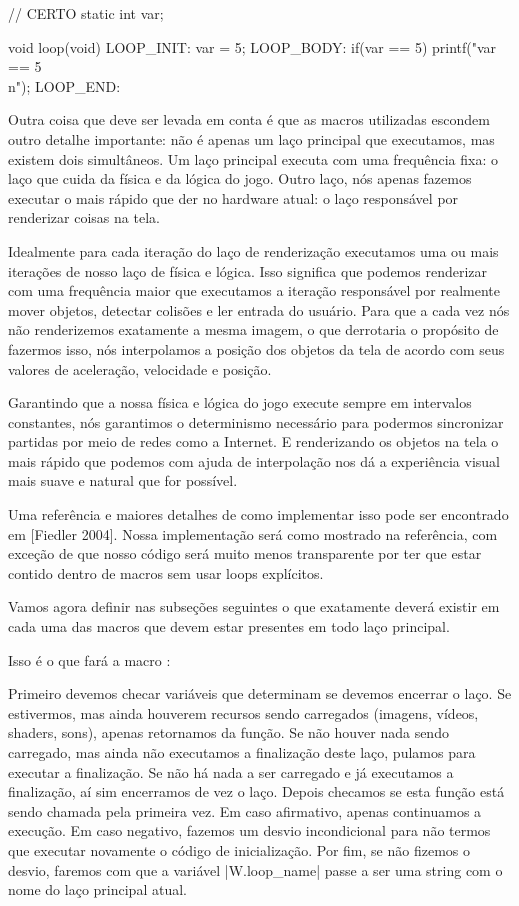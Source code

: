 \alinhaverbatim
// CERTO
static int var;

void loop(void){
LOOP\_INIT:
  var = 5;
LOOP\_BODY:
  if(var == 5)
    printf("var == 5\\n");
LOOP\_END:
}
\alinhanormal

Outra coisa que deve ser levada em conta é que as macros utilizadas
escondem outro detalhe importante: não é apenas um laço principal que
executamos, mas existem dois simultâneos. Um laço principal executa
com uma frequência fixa: o laço que cuida da física e da lógica do
jogo. Outro laço, nós apenas fazemos executar o mais rápido que der no
hardware atual: o laço responsável por renderizar coisas na tela.

Idealmente para cada iteração do laço de renderização executamos uma
ou mais iterações de nosso laço de física e lógica. Isso significa que
podemos renderizar com uma frequência maior que executamos a iteração
responsável por realmente mover objetos, detectar colisões e ler
entrada do usuário. Para que a cada vez nós não renderizemos
exatamente a mesma imagem, o que derrotaria o propósito de fazermos
isso, nós interpolamos a posição dos objetos da tela de acordo com
seus valores de aceleração, velocidade e posição.

Garantindo que a nossa física e lógica do jogo execute sempre em
intervalos constantes, nós garantimos o determinismo necessário para
podermos sincronizar partidas por meio de redes como a Internet. E
renderizando os objetos na tela o mais rápido que podemos com ajuda de
interpolação nos dá a experiência visual mais suave e natural que for
possível.

Uma referência e maiores detalhes de como implementar isso pode ser
encontrado em [Fiedler 2004]. Nossa implementação será como mostrado
na referência, com exceção de que nosso código será muito menos
transparente por ter que estar contido dentro de macros sem usar loops
explícitos.

Vamos agora definir nas subseções seguintes o que exatamente deverá
existir em cada uma das macros que devem estar presentes em todo laço
principal.


Isso é o que fará a macro :

Primeiro devemos checar variáveis que determinam se devemos encerrar o
laço. Se estivermos, mas ainda houverem recursos sendo carregados
(imagens, vídeos, shaders, sons), apenas retornamos da função. Se não
houver nada sendo carregado, mas ainda não executamos a finalização
deste laço, pulamos para executar a finalização. Se não há nada a ser
carregado e já executamos a finalização, aí sim encerramos de vez o
laço. Depois checamos se esta função está sendo chamada pela primeira
vez. Em caso afirmativo, apenas continuamos a execução. Em caso
negativo, fazemos um desvio incondicional para não termos que executar
novamente o código de inicialização. Por fim, se não fizemos o desvio,
faremos com que a variável |W.loop_name| passe a ser uma string com o
nome do laço principal atual.

